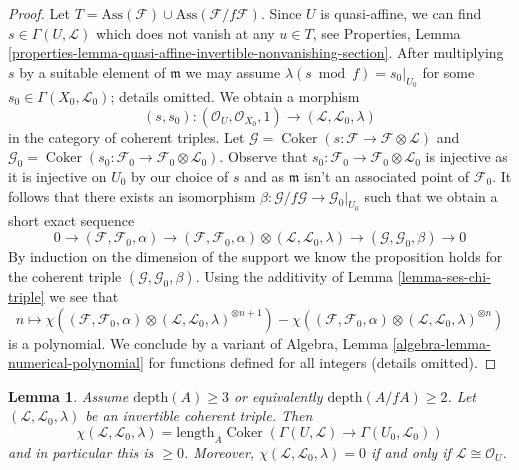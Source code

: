 \documentclass{stacks-project}
\theoremstyle{plain}
\newtheorem{lemma}[subsection]{Lemma}
\theoremstyle{definition}
\theoremstyle{remark}
\numberwithin{equation}{subsection}
\def\Coker{\mathop{\mathrm{Coker}}}
\begin{document}
\begin{proof}
\medskip\noindent
Let $T = \text{Ass}(\mathcal{F}) \cup \text{Ass}(\mathcal{F}/f\mathcal{F})$.
Since $U$ is quasi-affine, we can find $s \in \Gamma(U, \mathcal{L})$
which does not vanish at any $u \in T$, see
Properties, Lemma
\ref{properties-lemma-quasi-affine-invertible-nonvanishing-section}.
After multiplying $s$ by a suitable element of $\mathfrak m$
we may assume $\lambda(s \bmod f) = s_0|_{U_0}$ for some
$s_0 \in \Gamma(X_0, \mathcal{L}_0)$; details omitted.
We obtain a morphism
$$
(s, s_0) :
(\mathcal{O}_U, \mathcal{O}_{X_0}, 1)
\longrightarrow
(\mathcal{L}, \mathcal{L}_0, \lambda)
$$
in the category of coherent triples. Let
$\mathcal{G} = \Coker(s : \mathcal{F} \to \mathcal{F} \otimes \mathcal{L})$
and
$\mathcal{G}_0 = \Coker(s_0 : \mathcal{F}_0 \to
\mathcal{F}_0 \otimes \mathcal{L}_0)$. Observe that $s_0 : \mathcal{F}_0 \to
\mathcal{F}_0 \otimes \mathcal{L}_0$ is injective as it is injective
on $U_0$ by our choice of $s$ and as $\mathfrak m$ isn't an
associated point of $\mathcal{F}_0$. It follows that
there exists an
isomorphism $\beta : \mathcal{G}/f\mathcal{G} \to \mathcal{G}_0|_{U_0}$
such that we obtain a short exact sequence
$$
0 \to
(\mathcal{F}, \mathcal{F}_0, \alpha) \to
(\mathcal{F}, \mathcal{F}_0, \alpha) \otimes
(\mathcal{L}, \mathcal{L}_0, \lambda) \to
(\mathcal{G}, \mathcal{G}_0, \beta) \to 0
$$
By induction on the dimension of the support we know the proposition
holds for the coherent triple $(\mathcal{G}, \mathcal{G}_0, \beta)$.
Using the additivity of Lemma \ref{lemma-ses-chi-triple}
we see that
$$
n \longmapsto 
\chi((\mathcal{F}, \mathcal{F}_0, \alpha) \otimes
(\mathcal{L}, \mathcal{L}_0, \lambda)^{\otimes n + 1})
-
\chi((\mathcal{F}, \mathcal{F}_0, \alpha) \otimes
(\mathcal{L}, \mathcal{L}_0, \lambda)^{\otimes n})
$$
is a polynomial. We conclude by a variant of
Algebra, Lemma \ref{algebra-lemma-numerical-polynomial}
for functions defined for all integers (details omitted).
\end{proof}

\begin{lemma}
\label{lemma-nonnegative-chi-triple}
Assume $\text{depth}(A) \geq 3$ or equivalently
$\text{depth}(A/fA) \geq 2$. Let $(\mathcal{L}, \mathcal{L}_0, \lambda)$
be an invertible coherent triple. Then
$$
\chi(\mathcal{L}, \mathcal{L}_0, \lambda) =
\text{length}_A \Coker(\Gamma(U, \mathcal{L}) \to \Gamma(U_0, \mathcal{L}_0))
$$
and in particular this is $\geq 0$. Moreover, 
$\chi(\mathcal{L}, \mathcal{L}_0, \lambda) = 0$ if and only if
$\mathcal{L} \cong \mathcal{O}_U$.
\end{lemma}
\end{document}
